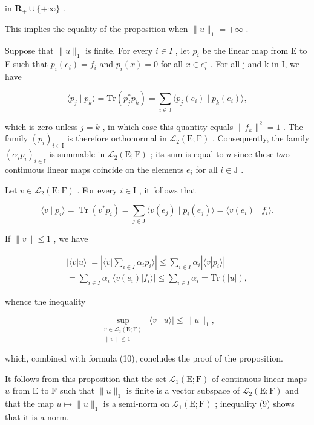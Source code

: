 in \(\mathbf{R}_{+}\cup\{+\infty\}\) .

This implies the equality of the proposition when \(\|u\|_{1}=+\infty\) .

Suppose that \(\|u\|_{1}\) is finite. For every \(i \in I\) , let \(p_{i}\) be the linear map from E to F such that \(p_{i}(e_{i}) = f_{i}\) and \(p_{i}(x) = 0\) for all \(x \in e_{i}^{\circ}\) . For all j and k in I, we have

\[
\langle p _ {j} \mid p _ {k} \rangle = \mathrm{Tr} (p _ {j} ^ {*} p _ {k}) = \sum_ {i \in \mathrm{J}} \langle p _ {j} (e _ {i}) \mid p _ {k} (e _ {i}) \rangle ,
\]

which is zero unless \(j = k\) , in which case this quantity equals \(\| f_k\|^2 = 1\) . The family \((p_i)_{i \in \mathrm{I}}\) is therefore orthonormal in \(\mathcal{L}_2(\mathrm{E};\mathrm{F})\) . Consequently, the family \((\alpha_i p_i)_{i \in \mathrm{I}}\) is summable in \(\mathcal{L}_2(\mathrm{E};\mathrm{F})\) ; its sum is equal to \(u\) since these two continuous linear maps coincide on the elements \(e_i\) for all \(i \in \mathrm{J}\) .

Let \(v \in \mathcal{L}_2(\mathrm{E};\mathrm{F})\) . For every \(i \in \mathrm{I}\) , it follows that

\[
\langle v \mid p _ {i} \rangle = \operatorname{Tr} (v ^ {*} p _ {i}) = \sum_ {j \in \mathrm{J}} \langle v (e _ {j}) \mid p _ {i} (e _ {j}) \rangle = \langle v (e _ {i}) \mid f _ {i} \rangle .
\]

If \(\|v\| \leqslant 1\) , we have

\[
\begin{array}{c} | \langle v | u \rangle | = \left| \langle v | \sum_ {i \in I} \alpha_ {i} p _ {i} \rangle \right| \leqslant \sum_ {i \in I} \alpha_ {i} | \langle v | p _ {i} \rangle | \\ = \sum_ {i \in I} \alpha_ {i} | \langle v (e _ {i}) | f _ {i} \rangle | \leqslant \sum_ {i \in I} \alpha_ {i} = \mathrm{Tr} (| u |), \end{array}
\]

whence the inequality

\[
\sup_{\substack{v\in \mathcal{L}_{2}(\mathrm{E};\mathrm{F})\\ \| v\| \leqslant 1}}|\langle v\mid u\rangle |\leqslant \| u\|_{1},
\]

which, combined with formula (10), concludes the proof of the proposition.

It follows from this proposition that the set \(\mathcal{L}_1(\mathrm{E};\mathrm{F})\) of continuous linear maps \(u\) from E to F such that \(\| u\| _1\) is finite is a vector subspace of \(\mathcal{L}_{2}(\mathrm{E};\mathrm{F})\) and that the map \(u\mapsto \| u\| _1\) is a semi-norm on \(\mathcal{L}_1(\mathrm{E};\mathrm{F})\) ; inequality (9) shows that it is a norm.

